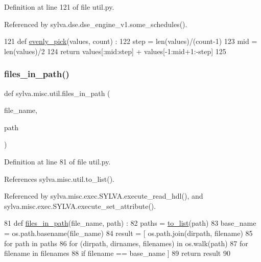 Definition at line 121 of file util.\+py.



Referenced by sylva.\+dse.\+dse\+\_\+engine\+\_\+v1.\+some\+\_\+schedules().


\begin{DoxyCode}
121 \textcolor{keyword}{def }\hyperlink{namespacesylva_1_1misc_1_1util_a0881116abd7a50c6cd552b6b3edafea3}{evenly\_pick}(values, count) :
122   step = len(values)/(count-1)
123   mid = len(values)/2
124   \textcolor{keywordflow}{return} values[:mid:step] + values[-1:mid+1:-step]
125 
\end{DoxyCode}
\mbox{\label{namespacesylva_1_1misc_1_1util_a7ad460a52be16d3083cb41f0be004714}} 
\subsubsection{\texorpdfstring{files\+\_\+in\+\_\+path()}{files\_in\_path()}}
{\footnotesize\ttfamily def sylva.\+misc.\+util.\+files\+\_\+in\+\_\+path (\begin{DoxyParamCaption}\item[{}]{file\+\_\+name,  }\item[{}]{path }\end{DoxyParamCaption})}



Definition at line 81 of file util.\+py.



References sylva.\+misc.\+util.\+to\+\_\+list().



Referenced by sylva.\+misc.\+exec.\+S\+Y\+L\+V\+A.\+execute\+\_\+read\+\_\+hdl(), and sylva.\+misc.\+exec.\+S\+Y\+L\+V\+A.\+execute\+\_\+set\+\_\+attribute().


\begin{DoxyCode}
81 \textcolor{keyword}{def }\hyperlink{namespacesylva_1_1misc_1_1util_a7ad460a52be16d3083cb41f0be004714}{files\_in\_path}(file\_name, path) :
82   paths = \hyperlink{namespacesylva_1_1misc_1_1util_a03f5cfd365a10a5ec0567e320f987a9b}{to\_list}(path)
83   base\_name = os.path.basename(file\_name)
84   result = [ os.path.join(dirpath, filename)
85     \textcolor{keywordflow}{for} path \textcolor{keywordflow}{in} paths
86       \textcolor{keywordflow}{for} (dirpath, dirnames, filenames) \textcolor{keywordflow}{in} os.walk(path)
87         \textcolor{keywordflow}{for} filename \textcolor{keywordflow}{in} filenames
88     \textcolor{keywordflow}{if} filename == base\_name ]
89   \textcolor{keywordflow}{return} result
90 
\end{DoxyCode}
\mbox{\label{namespacesylva_1_1misc_1_1util_a32b5da1967e998035c511c75ccccdf89}} 

